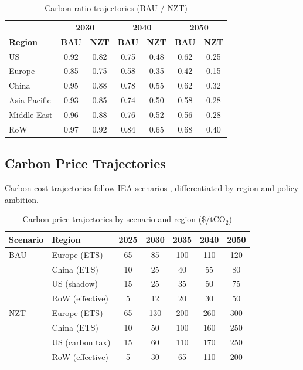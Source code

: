\begin{table}[H]
\centering
\small
\caption{Carbon ratio trajectories (BAU / NZT)}
\label{tab:app_carbon_ratio}
\begin{tabular}{@{}lcc|cc|cc@{}}
\toprule
& \multicolumn{2}{c|}{\textbf{2030}} & \multicolumn{2}{c|}{\textbf{2040}} & \multicolumn{2}{c}{\textbf{2050}} \\
\textbf{Region} & \textbf{BAU} & \textbf{NZT} & \textbf{BAU} & \textbf{NZT} & \textbf{BAU} & \textbf{NZT} \\
\midrule
US & 0.92 & 0.82 & 0.75 & 0.48 & 0.62 & 0.25 \\
Europe & 0.85 & 0.75 & 0.58 & 0.35 & 0.42 & 0.15 \\
China & 0.95 & 0.88 & 0.78 & 0.55 & 0.62 & 0.32 \\
Asia-Pacific & 0.93 & 0.85 & 0.74 & 0.50 & 0.58 & 0.28 \\
Middle East & 0.96 & 0.88 & 0.76 & 0.52 & 0.56 & 0.28 \\
RoW & 0.97 & 0.92 & 0.84 & 0.65 & 0.68 & 0.40 \\
\bottomrule
\end{tabular}
\end{table}



\subsection{Carbon Price Trajectories}
\label{app:carbon_price}

Carbon cost trajectories follow IEA scenarios \citep{iea2024}, differentiated by region and policy ambition.

\begin{table}[H]
\centering
\small
\caption{Carbon price trajectories by scenario and region (\$/tCO$_2$)}
\label{tab:app_carbon_price}
\begin{tabular}{@{}llccccc@{}}
\toprule
\textbf{Scenario} & \textbf{Region} & \textbf{2025} & \textbf{2030} & \textbf{2035} & \textbf{2040} & \textbf{2050} \\
\midrule
BAU & Europe (ETS) & 65 & 85 & 100 & 110 & 120 \\
 & China (ETS) & 10 & 25 & 40 & 55 & 80 \\
 & US (shadow) & 15 & 25 & 35 & 50 & 75 \\
 & RoW (effective) & 5 & 12 & 20 & 30 & 50 \\
\midrule
NZT & Europe (ETS) & 65 & 130 & 200 & 260 & 300 \\
 & China (ETS) & 10 & 50 & 100 & 160 & 250 \\
 & US (carbon tax) & 15 & 60 & 110 & 170 & 250 \\
 & RoW (effective) & 5 & 30 & 65 & 110 & 200 \\
\bottomrule
\end{tabular}
\end{table}

